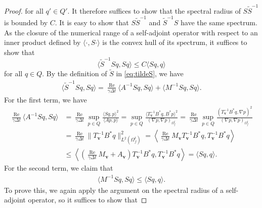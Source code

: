 \documentclass{article}
\newcommand{\bv}{{\mathbf{v}}}
\newcommand{\Reynolds}{{\operatorname{Re}}}
\begin{document}
\begin{proof}
for all $q' \in Q'$. It therefore suffices to show that the spectral radius of $S \tilde{S}^{-1}$ is bounded by $C$.
It is easy to show that $S \tilde{S}^{-1}$ and $\tilde{S}^{-1} S$ have the same spectrum.
As the closure of the numerical range of a self-adjoint operator with respect to an inner product defined by $\langle \cdot, S\cdot \rangle$ is the convex hull of its spectrum, it suffices to show that
\begin{equation}
    \langle \tilde{S}^{-1} S q, S q \rangle \leq C \langle S q, q \rangle
\end{equation}
for all $q \in Q$. By the definition of $\tilde{S}$ in \eqref{eq:tildeS}, we have
\begin{equation}
    \begin{aligned}
        \langle \tilde{S}^{-1} S q, S q \rangle = \frac{\Reynolds}{\gamma\Delta t} \langle A^{-1} S q, S q \rangle + \langle M^{-1} S q, S q \rangle.
    \end{aligned}
\end{equation}
For the first term, we have
\begin{equation}
    \begin{aligned}
        \frac{\Reynolds}{\gamma\Delta t} \langle A^{-1} S q, S q \rangle 
        &= \frac{\Reynolds}{\gamma\Delta t} \sup_{p \in Q} \frac{\langle S q, p \rangle^2}{\langle A p, p \rangle} 
         = \sup_{p \in Q} \frac{\langle T_\bv^{-1} B^* q, B^* p \rangle^2}{(\nabla p, \nabla p)_{\Omega_f^t}} 
         = \frac{\Reynolds}{\gamma\Delta t} \sup_{p \in Q} \frac{(T_\bv^{-1} B^* q, \nabla p)^2}{(\nabla p, \nabla p)_{\Omega_f^t}} \\
        &= \frac{\Reynolds}{\gamma\Delta t} \|T_\bv^{-1} B^* q\|_{L^2(\Omega_f^t)}^2 
         = \left\langle \frac{\Reynolds}{\gamma\Delta t} M_\bv T_\bv^{-1} B^* q, T_\bv^{-1} B^* q \right\rangle \\
        &\leq \left\langle \left( \frac{\Reynolds}{\gamma\Delta t} M_\bv + A_\bv \right) T_\bv^{-1} B^* q, T_\bv^{-1} B^* q \right\rangle 
         = \langle S q, q \rangle.
    \end{aligned}
\end{equation}
For the second term, we claim that
\begin{equation}
    \begin{aligned}
        \langle M^{-1} S q, S q \rangle \leq \langle S q, q \rangle.
    \end{aligned}
\end{equation}
To prove this, we again apply the argument on the spectral radius of a self-adjoint operator, so it suffices to show that

\end{proof}
\end{document}
